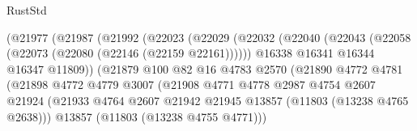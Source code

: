 \begin{lexlean}{RustStd}
\begin{coremodule}
                                    (@21977
                                      (@21987
                                        (@21992
                                          (@22023
                                            (@22029
                                              (@22032
                                                (@22040
                                                  (@22043
                                                    (@22058
                                                      (@22073 (@22080 (@22146 (@22159 @22161))))))
                                                  @16338
                                                  @16341
                                                  @16344
                                                  @16347
                                                  @11809))
                                              (@21879
                                                @100
                                                @82
                                                @16
                                                @4783
                                                @2570
                                                (@21890
                                                  @4772
                                                  @4781
                                                  (@21898
                                                    @4772
                                                    @4779
                                                    @3007
                                                    (@21908
                                                      @4771
                                                      @4778
                                                      @2987
                                                      @4754
                                                      @2607
                                                      @21924
                                                      (@21933
                                                        @4764
                                                        @2607
                                                        @21942
                                                        @21945
                                                        @13857
                                                        (@11803 (@13238 @4765 @2638)))
                                                      @13857
                                                      (@11803 (@13238 @4755 @4771)))

\end{coremodule}
\end{lexlean}
